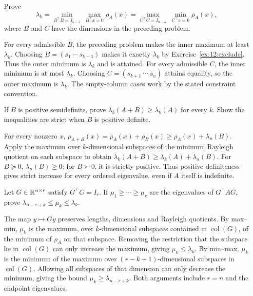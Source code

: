 \begin{problem}
Prove
\[
\lambda_k=\min_{B^\top B=I_{k-1}}\ \max_{B^\top x=0}\rho_A(x)
=\max_{C^\top C=I_{n-k}}\ \min_{C^\top x=0}\rho_A(x),
\]
where $B$ and $C$ have the dimensions in the preceding problem.
\end{problem}
\begin{solution}
For every admissible $B$, the preceding problem makes the inner maximum
at least $\lambda_k$. Choosing $B=(s_1\ \cdots\ s_{k-1})$ makes it
exactly $\lambda_k$ by Exercise~\ref{ex:12:exclude}. Thus the outer
minimum is $\lambda_k$ and is attained.
For every admissible $C$, the inner minimum is at most $\lambda_k$.
Choosing $C=(s_{k+1}\ \cdots\ s_n)$ attains equality, so the outer
maximum is $\lambda_k$. The empty-column cases work by the stated
constraint convention.
\end{solution}

\begin{problem}
If $B$ is positive semidefinite, prove
$\lambda_k(A+B)\geqslant\lambda_k(A)$ for every $k$.
Show the inequalities are strict when $B$ is positive definite.
\end{problem}
\begin{solution}
For every nonzero $x$,
$\rho_{A+B}(x)=\rho_A(x)+\rho_B(x)
\geqslant\rho_A(x)+\lambda_n(B)$.
Apply the maximum over $k$-dimensional subspaces of the minimum Rayleigh
quotient on each subspace to obtain
$\lambda_k(A+B)\geqslant\lambda_k(A)+\lambda_n(B)$.
For $B\succeq0$, $\lambda_n(B)\geqslant0$; for $B\succ0$, it is
strictly positive. Thus positive definiteness gives strict increase for
every ordered eigenvalue, even if $A$ itself is indefinite.
\end{solution}

\begin{problem}\label{ex:12:separation}
Let $G\in\mathbb R^{n\times r}$ satisfy $G^\top G=I_r$. If
$\mu_1\geqslant\cdots\geqslant\mu_r$ are the eigenvalues of $G^\top AG$,
prove $\lambda_{n-r+k}\leqslant\mu_k\leqslant\lambda_k$.
\end{problem}
\begin{solution}
The map $y\mapsto Gy$ preserves lengths, dimensions and Rayleigh
quotients. By max--min, $\mu_k$ is the maximum, over $k$-dimensional
subspaces contained in $\operatorname{col}(G)$, of the minimum of
$\rho_A$ on that subspace. Removing the restriction that the subspace
lie in $\operatorname{col}(G)$ can only increase the maximum, giving
$\mu_k\leqslant\lambda_k$.
By min--max, $\mu_k$ is the minimum of the maximum over
$(r-k+1)$-dimensional subspaces in $\operatorname{col}(G)$.
Allowing all subspaces of that dimension can only decrease the minimum,
giving the bound $\mu_k\geqslant\lambda_{n-r+k}$.
Both arguments include $r=n$ and the endpoint eigenvalues.
\end{solution}

